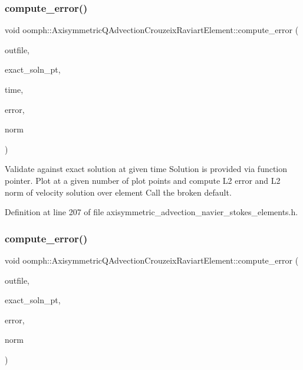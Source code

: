 \subsubsection{\texorpdfstring{compute\+\_\+error()}{compute\_error()}\hspace{0.1cm}{\footnotesize\ttfamily [1/2]}}
{\footnotesize\ttfamily void oomph\+::\+Axisymmetric\+Q\+Advection\+Crouzeix\+Raviart\+Element\+::compute\+\_\+error (\begin{DoxyParamCaption}\item[{std\+::ostream \&}]{outfile,  }\item[{Finite\+Element\+::\+Unsteady\+Exact\+Solution\+Fct\+Pt}]{exact\+\_\+soln\+\_\+pt,  }\item[{const double \&}]{time,  }\item[{double \&}]{error,  }\item[{double \&}]{norm }\end{DoxyParamCaption})\hspace{0.3cm}{\ttfamily [inline]}}



Validate against exact solution at given time Solution is provided via function pointer. Plot at a given number of plot points and compute L2 error and L2 norm of velocity solution over element Call the broken default. 



Definition at line 207 of file axisymmetric\+\_\+advection\+\_\+navier\+\_\+stokes\+\_\+elements.\+h.

\mbox{\label{classoomph_1_1AxisymmetricQAdvectionCrouzeixRaviartElement_a888aea94c99e6b764c028e39eef7c389}} 
\subsubsection{\texorpdfstring{compute\+\_\+error()}{compute\_error()}\hspace{0.1cm}{\footnotesize\ttfamily [2/2]}}
{\footnotesize\ttfamily void oomph\+::\+Axisymmetric\+Q\+Advection\+Crouzeix\+Raviart\+Element\+::compute\+\_\+error (\begin{DoxyParamCaption}\item[{std\+::ostream \&}]{outfile,  }\item[{Finite\+Element\+::\+Steady\+Exact\+Solution\+Fct\+Pt}]{exact\+\_\+soln\+\_\+pt,  }\item[{double \&}]{error,  }\item[{double \&}]{norm }\end{DoxyParamCaption})\hspace{0.3cm}{\ttfamily [inline]}}



